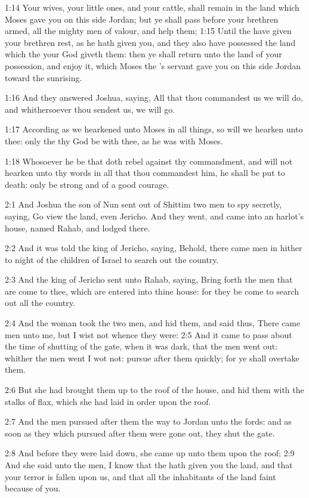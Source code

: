1:14 Your wives, your little ones, and your cattle, shall remain in
the land which Moses gave you on this side Jordan; but ye shall pass
before your brethren armed, all the mighty men of valour, and help
them; 1:15 Until the \LORD have given your brethren rest, as he hath
given you, and they also have possessed the land which the \LORD your
God giveth them: then ye shall return unto the land of your
possession, and enjoy it, which Moses the \LORD's servant gave you on
this side Jordan toward the sunrising.

1:16 And they answered Joshua, saying, All that thou commandest us we
will do, and whithersoever thou sendest us, we will go.

1:17 According as we hearkened unto Moses in all things, so will we
hearken unto thee: only the \LORD thy God be with thee, as he was with
Moses.

1:18 Whosoever he be that doth rebel against thy commandment, and will
not hearken unto thy words in all that thou commandest him, he shall
be put to death: only be strong and of a good courage.

2:1 And Joshua the son of Nun sent out of Shittim two men to spy
secretly, saying, Go view the land, even Jericho. And they went, and
came into an harlot's house, named Rahab, and lodged there.

2:2 And it was told the king of Jericho, saying, Behold, there came
men in hither to night of the children of Israel to search out the
country.

2:3 And the king of Jericho sent unto Rahab, saying, Bring forth the
men that are come to thee, which are entered into thine house: for
they be come to search out all the country.

2:4 And the woman took the two men, and hid them, and said thus, There
came men unto me, but I wist not whence they were: 2:5 And it came to
pass about the time of shutting of the gate, when it was dark, that
the men went out: whither the men went I wot not: pursue after them
quickly; for ye shall overtake them.

2:6 But she had brought them up to the roof of the house, and hid them
with the stalks of flax, which she had laid in order upon the roof.

2:7 And the men pursued after them the way to Jordan unto the fords:
and as soon as they which pursued after them were gone out, they shut
the gate.

2:8 And before they were laid down, she came up unto them upon the
roof; 2:9 And she said unto the men, I know that the \LORD hath given
you the land, and that your terror is fallen upon us, and that all the
inhabitants of the land faint because of you.

